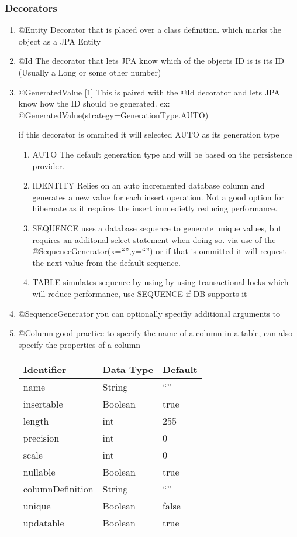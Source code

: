 \documentclass[11pt]{article}
\begin{document}
\subsubsection{Decorators}
\label{sec:org974770d}
\begin{enumerate}
\item @Entity
\label{sec:orged1d976}
Decorator that is placed over a class definition. which marks the object as a JPA Entity
\item @Id
\label{sec:orgb874901}
The decorator that lets JPA know which of the objects ID is is its ID (Usually a Long or some other number)
\item @GeneratedValue [1]
\label{sec:org5da3115}
This is paired with the @Id decorator and lets JPA know how the ID should be generated. ex: @GeneratedValue(strategy=GenerationType.AUTO)

if this decorator is ommited it will selected AUTO as its generation type

\begin{enumerate}
\item AUTO
\label{sec:org074045e}
The default generation type and will be based on the persistence provider.
\item IDENTITY
\label{sec:orgc50e88d}
Relies on an auto incremented database column and generates a new value for each insert operation. Not a good option for hibernate as it requires the insert immedietly reducing performance.
\item SEQUENCE
\label{sec:org0e93c3b}
uses a database sequence to generate unique values, but requires an additonal select statement when doing so. via use of the @SequenceGenerator(x=``'',y=``'') or if that is ommitted it will request the next value from the default sequence.
\item TABLE
\label{sec:org43ead2e}
simulates sequence by using by using transactional locks which will reduce performance, use SEQUENCE if DB supports it
\end{enumerate}
\item @SequenceGenerator
\label{sec:orgd53c959}
you can optionally specifiy additional arguments to
\item @Column
\label{sec:orge4fc54a}
good practice to specify the name of a column in a table, can also specify the properties of a column

\begin{center}
\begin{tabular}{lll}
Identifier & Data Type & Default\\
\hline
name & String & ``''\\
insertable & Boolean & true\\
length & int & 255\\
precision & int & 0\\
scale & int & 0\\
nullable & Boolean & true\\
columnDefinition & String & ``''\\
unique & Boolean & false\\
updatable & Boolean & true\\
\end{tabular}
\end{center}



\end{enumerate}
\end{document}
